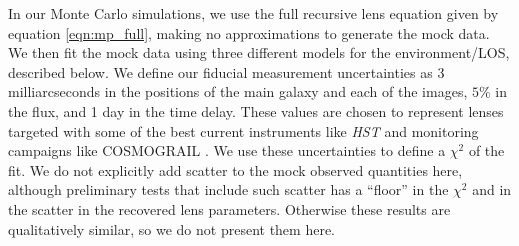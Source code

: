 In our Monte Carlo simulations, we use the full recursive lens equation given by equation \ref{eqn:mp_full}, making no approximations to generate the mock data. We then fit the mock data using three different models for the environment/LOS, described below. We define our fiducial measurement uncertainties as 3 milliarcseconds in the positions of the main galaxy and each of the images, $5\%$ in the flux, and 1 day in the time delay. These values are chosen to represent lenses targeted with some of the best current instruments like \textit{HST} and monitoring campaigns like COSMOGRAIL \citep{Eigenbrod05}. We use these uncertainties to define a $\chi^2$ of the fit. We do not explicitly add scatter to the mock observed quantities here, although preliminary tests that include such scatter has a ``floor'' in the $\chi^2$ and in the scatter in the recovered lens parameters. Otherwise these results are qualitatively similar, so we do not present them here.
  